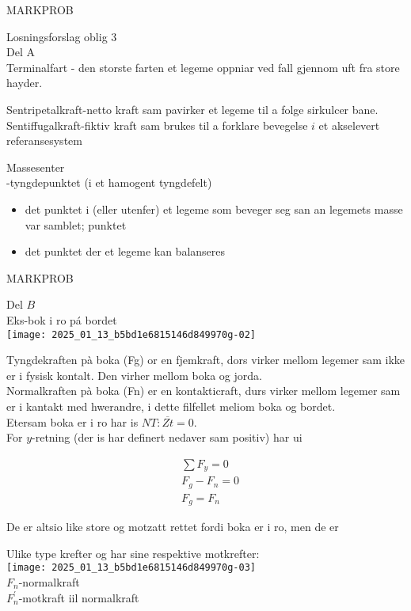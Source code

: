 \documentclass[10pt]{article}
\begin{document}
MARKPROB

Losningsforslag oblig 3\\
Del A\\
Terminalfart - den storste farten et legeme oppniar ved fall gjennom uft fra store hayder.

Sentripetalkraft-netto kraft sam pavirker et legeme til a folge sirkulcer bane.\\
Sentiffugalkraft-fiktiv kraft sam brukes til a forklare bevegelse $i$ et akselevert referansesystem

Massesenter\\
-tyngdepunktet (i et hamogent tyngdefelt)

\begin{itemize}
  \item det punktet i (eller utenfer) et legeme som beveger seg san an legemets masse var samblet; punktet
  \item det punktet der et legeme kan balanseres
\end{itemize}

MARKPROB

Del $B$\\
Eks-bok i ro pá bordet\\
\texttt{[image: 2025\_01\_13\_b5bd1e6815146d849970g-02]}

Tyngdekraften pà boka (Fg) or en fjemkraft, dors virker mellom legemer sam ikke er i fysisk kontalt. Den virher mellom boka og jorda.\\
Normalkraften pà boka (Fn) er en kontakticraft, durs virker mellom legemer sam er i kantakt med hwerandre, i dette filfellet meliom boka og bordet.\\
Etersam boka er i ro har is $N T: \overline{Z t}=0$.\\
For $y$-retning (der is har definert nedaver sam positiv) har ui

$$
\begin{aligned}
& \sum F_{y}=0 \\
& F_{g}-F_{n}=0 \\
& F_{g}=F_{n}
\end{aligned}
$$

De er altsio like store og motzatt rettet fordi boka er i ro, men de er

Ulike type krefter og har sine respektive motkrefter:\\
\texttt{[image: 2025\_01\_13\_b5bd1e6815146d849970g-03]}\\
$F_{n}$-normalkraft\\
$F_{n}^{\prime}$-motkraft iil normalkraft
\end{document}
